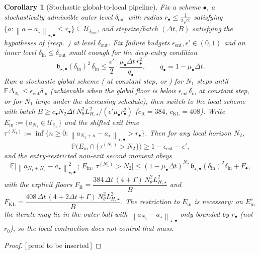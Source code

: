 \documentclass[11pt]{article}
\theoremstyle{plain}
\newtheorem{corollary}[corollary]{Corollary}
\theoremstyle{definition}
\theoremstyle{remark}
\newcommand{\E}{\mathbb{E}}
\newcommand{\Prob}{\mathbb{P}}
\newcommand{\KL}{\mathrm{KL}}
\newcommand{\Riem}{\mathrm{R}}
\newcommand{\norm}[1]{\left\lVert #1\right\rVert}
\newcommand{\Ureg}{\mathcal{U}}
\newcommand{\LHs}{L_{H,\star}}
\newcommand{\PROOFHOLE}{{\color{red}\textsf{[\,proof to be inserted\,]}}}
\begin{document}
\begin{corollary}[Stochastic global-to-local pipeline]
\label{cor:stoch-three-stage}
Fix a scheme $\bullet$, a stochastically admissible outer level $\delta_{\mathrm{out}}$ with radius
$r_\bullet\leq\tfrac1{2\sqrt2}$ satisfying $\{a:\norm{a-a_\star}_{\star,\bullet}\leq r_\bullet\}\subseteq\Ureg_{\delta_{\mathrm{out}}}$,
and stepsize/batch $(\Delta t,B)$ satisfying the hypotheses of  (resp.\
) at level $\delta_{\mathrm{out}}$. Fix failure budgets
$\epsilon_{\mathrm{ent}},\epsilon'\in(0,1)$ and an inner level $\delta_{\mathrm{in}}\leq\delta_{\mathrm{out}}$
small enough for the deep-entry condition
\[
    \mathfrak b_{\star,\bullet}(\delta_{\mathrm{in}})^2\,\delta_{\mathrm{in}}
    \leq\frac{\epsilon'}2\cdot\frac{\mu_\bullet\Delta t\,r_\bullet^2}{q_\bullet},\qquad q_\bullet=1-\mu_\bullet\Delta t .
\]
Run a stochastic global scheme (
at constant step, or \Cref{thm:decreasing}) for $N_1$ steps until $\E\Delta_{N_1}\leq\epsilon_{\mathrm{ent}}\delta_{\mathrm{in}}$
(achievable when the global floor is below $\epsilon_{\mathrm{ent}}\delta_{\mathrm{in}}$ at constant step,
or for $N_1$ large under the decreasing schedule), then switch to the local scheme with batch
$B\geq c_\bullet N_2\Delta t\,N_\theta^2\LHs^2/(\epsilon'\mu_\bullet r_\bullet^2)$ ($c_{\Riem}=384$,
$c_{\KL}=408$). Write $E_{\mathrm{in}}:=\{a_{N_1}\in\Ureg_{\delta_{\mathrm{in}}}\}$ and the shifted exit
time $\tau^{(N_1)}:=\inf\{n\geq0:\norm{a_{N_1+n}-a_\star}_{\star,\bullet}>r_\bullet\}$. Then for any local
horizon $N_2$,
\[
    \Prob\bigl(E_{\mathrm{in}}\cap\{\tau^{(N_1)}>N_2\}\bigr)\geq 1-\epsilon_{\mathrm{ent}}-\epsilon',
\]
and the entry-restricted non-exit second moment obeys
\[
    \E\bigl[\norm{a_{N_1+N_2}-a_\star}_{\star,\bullet}^2\,;\,E_{\mathrm{in}},\,\tau^{(N_1)}>N_2\bigr]
    \leq(1-\mu_\bullet\Delta t)^{N_2}\,\mathfrak b_{\star,\bullet}(\delta_{\mathrm{in}})^2\delta_{\mathrm{in}}
    +F_\bullet,
\]
with the explicit floors
$F_{\Riem}=\dfrac{384\,\Delta t\,(4+\Gamma)\,N_\theta^2\LHs^2}{B}$ and
$F_{\KL}=\dfrac{408\,\Delta t\,(4+2\Delta t+\Gamma)\,N_\theta^2\LHs^2}{B}$. The restriction to
$E_{\mathrm{in}}$ is necessary: on $E_{\mathrm{in}}^c$ the iterate may lie in the outer ball with
$\norm{a_{N_1}-a_\star}_{\star,\bullet}$ only bounded by $r_\bullet$ (not $r_0$), so the local
contraction does not control that mass.
\end{corollary}

\begin{proof}
\PROOFHOLE
\end{proof}
\end{document}
